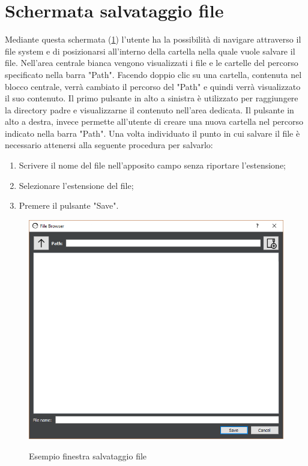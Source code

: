 	\section{Schermata salvataggio file}
	
	
		Mediante questa schermata (\ref{fig:filebrowser-save}) l'utente ha la possibilità di navigare attraverso il file system e di posizionarsi all'interno della cartella nella quale vuole salvare il file.
		Nell'area centrale bianca vengono visualizzati i file e le cartelle del percorso specificato nella barra "Path". Facendo doppio clic su una cartella, contenuta nel blocco centrale, verrà cambiato il percorso del "Path" e quindi verrà visualizzato il suo contenuto.
		Il primo pulsante in alto a sinistra è utilizzato per raggiungere la directory padre e visualizzarne il contenuto nell'area dedicata.
		Il pulsante in alto a destra, invece permette all'utente di creare una nuova cartella nel percorso indicato nella barra "Path". 
		Una volta individuato il punto in cui salvare il file è necessario attenersi alla seguente procedura per salvarlo:
		\begin{enumerate}
			\item{} Scrivere il nome del file nell'apposito campo senza riportare l'estensione;
			\item{} Selezionare l'estensione del file;
			\item{} Premere il pulsante "Save".
		\end{enumerate}
	\begin{figure}[htp]
			\caption{Esempio finestra salvataggio file}
			\centering
			\includegraphics[width=\textwidth]{../img/filebrowser-save.png}
			\label{fig:filebrowser-save}
		\end{figure}

